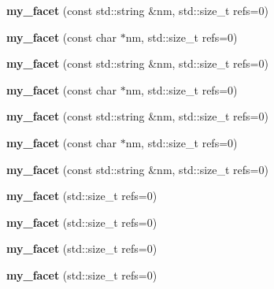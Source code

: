 \begin{DoxyCompactItemize}
{\bfseries my\+\_\+facet} (const std\+::string \&nm, std\+::size\+\_\+t refs=0)
\item 
\mbox{\label{structmy__facet_a8a7e169031980ff202f6efe4d7e24ddb}} 
{\bfseries my\+\_\+facet} (const char $\ast$nm, std\+::size\+\_\+t refs=0)
\item 
\mbox{\label{structmy__facet_a6729ecd86319119e683a0c214f4c49ed}} 
{\bfseries my\+\_\+facet} (const std\+::string \&nm, std\+::size\+\_\+t refs=0)
\item 
\mbox{\label{structmy__facet_a8a7e169031980ff202f6efe4d7e24ddb}} 
{\bfseries my\+\_\+facet} (const char $\ast$nm, std\+::size\+\_\+t refs=0)
\item 
\mbox{\label{structmy__facet_a6729ecd86319119e683a0c214f4c49ed}} 
{\bfseries my\+\_\+facet} (const std\+::string \&nm, std\+::size\+\_\+t refs=0)
\item 
\mbox{\label{structmy__facet_a8a7e169031980ff202f6efe4d7e24ddb}} 
{\bfseries my\+\_\+facet} (const char $\ast$nm, std\+::size\+\_\+t refs=0)
\item 
\mbox{\label{structmy__facet_a6729ecd86319119e683a0c214f4c49ed}} 
{\bfseries my\+\_\+facet} (const std\+::string \&nm, std\+::size\+\_\+t refs=0)
\item 
\mbox{\label{structmy__facet_aff29b1cbf5e107557c0f3763905c67c0}} 
{\bfseries my\+\_\+facet} (std\+::size\+\_\+t refs=0)
\item 
\mbox{\label{structmy__facet_aff29b1cbf5e107557c0f3763905c67c0}} 
{\bfseries my\+\_\+facet} (std\+::size\+\_\+t refs=0)
\item 
\mbox{\label{structmy__facet_aff29b1cbf5e107557c0f3763905c67c0}} 
{\bfseries my\+\_\+facet} (std\+::size\+\_\+t refs=0)
\item 
\mbox{\label{structmy__facet_aff29b1cbf5e107557c0f3763905c67c0}} 
{\bfseries my\+\_\+facet} (std\+::size\+\_\+t refs=0)
\item 
\mbox{\label{structmy__facet_aff29b1cbf5e107557c0f3763905c67c0}} 

\end{DoxyCompactItemize}
